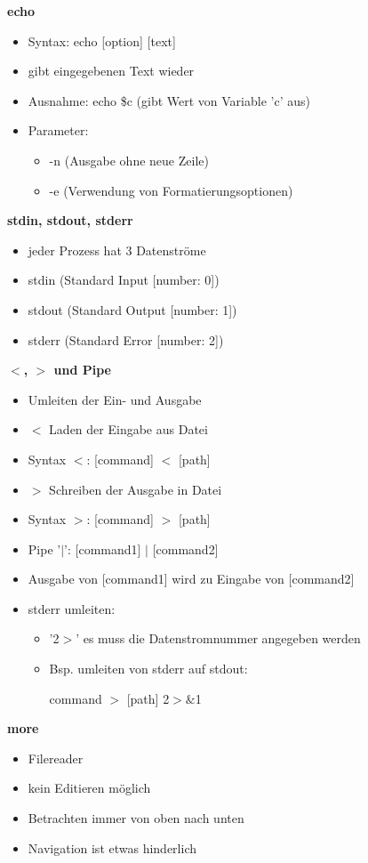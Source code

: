 \documentclass[12pt,utf8, 10pt]{article}
\begin{document}
\textbf{echo}
\begin{itemize}
	\item Syntax: echo [option] [text]
	\item gibt eingegebenen Text wieder
	\item Ausnahme: echo \$c (gibt Wert von Variable 'c' aus)
	\item Parameter:
	\begin{itemize}
		\item -n (Ausgabe ohne neue Zeile)
		\item -e (Verwendung von Formatierungsoptionen)
	\end{itemize}
\end{itemize}

\textbf{stdin, stdout, stderr}
\begin{itemize}
	\item jeder Prozess hat 3 Datenströme
	\item stdin (Standard Input [number: 0])
	\item stdout (Standard Output [number: 1])
	\item stderr (Standard Error [number: 2])
\end{itemize}

\textbf{$<$, $>$ und Pipe}
\begin{itemize}
	\item Umleiten der Ein- und Ausgabe
	\item $<$ Laden der Eingabe aus Datei
	\item Syntax $<$: [command] $<$ [path]
	\item $>$ Schreiben der Ausgabe in Datei
	\item Syntax $>$: [command] $>$ [path]
	\item Pipe '$\mid$': [command1] $\mid$ [command2]
	\item Ausgabe von [command1] wird zu Eingabe von [command2]
	\item stderr umleiten:
	\begin{itemize}
		\item '2$>$' es muss die Datenstromnummer angegeben werden
		\item Bsp. umleiten von stderr auf stdout:
		\item [command] $>$ [path] 2$>\&$1
	\end{itemize}	 
\end{itemize}

\textbf{more}
\begin{itemize}
	\item Filereader
	\item kein Editieren möglich
	\item Betrachten immer von oben nach unten
	\item Navigation ist etwas hinderlich
\end{itemize}
\end{document}
